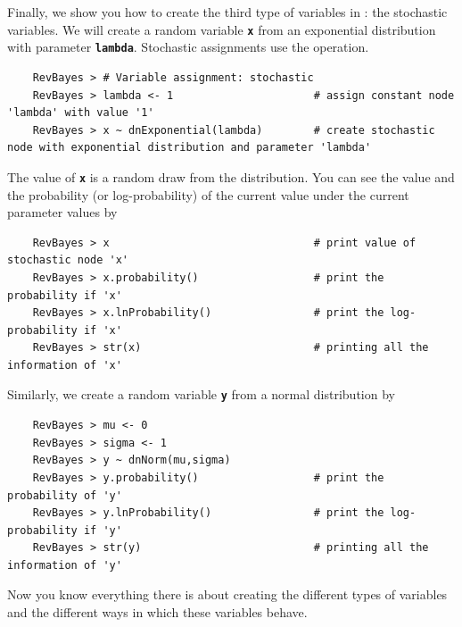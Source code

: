 \documentclass[11pt]{article}
\newcommand{\cl}[1]{{\texttt{\textbf{#1}}}}
\newcommand{\rbdn}{{\Large \symbol{126}}} %
\begin{document}
Finally, we show you how to create the third type of variables in \Rev: the stochastic variables. 
We will create a random variable \cl{x} from an exponential distribution with parameter \cl{lambda}.  
Stochastic assignments use the \cl{\rbdn} operation.
{\tt \begin{snugshade*}
\begin{lstlisting}    
    RevBayes > # Variable assignment: stochastic
    RevBayes > lambda <- 1                      # assign constant node 'lambda' with value '1'
    RevBayes > x ~ dnExponential(lambda)        # create stochastic node with exponential distribution and parameter 'lambda'
\end{lstlisting}
\end{snugshade*}}
The value of \cl{x} is a random draw from the distribution. 
You can see the value and the probability (or log-probability) of the current value under the current parameter values by
{\tt \begin{snugshade*}
\begin{lstlisting}    
    RevBayes > x                                # print value of stochastic node 'x'
    RevBayes > x.probability()                  # print the probability if 'x'
    RevBayes > x.lnProbability()                # print the log-probability if 'x'
    RevBayes > str(x)                           # printing all the information of 'x'
\end{lstlisting}
\end{snugshade*}}
Similarly, we create a random variable \cl{y} from a normal distribution by
{\tt \begin{snugshade*}
\begin{lstlisting}    
    RevBayes > mu <- 0
    RevBayes > sigma <- 1
    RevBayes > y ~ dnNorm(mu,sigma)	
    RevBayes > y.probability()                  # print the probability of 'y'
    RevBayes > y.lnProbability()                # print the log-probability if 'y'
    RevBayes > str(y)                           # printing all the information of 'y'
\end{lstlisting}
\end{snugshade*}}
Now you know everything there is about creating the different types of variables and the different ways in which these variables behave.
\end{document}
